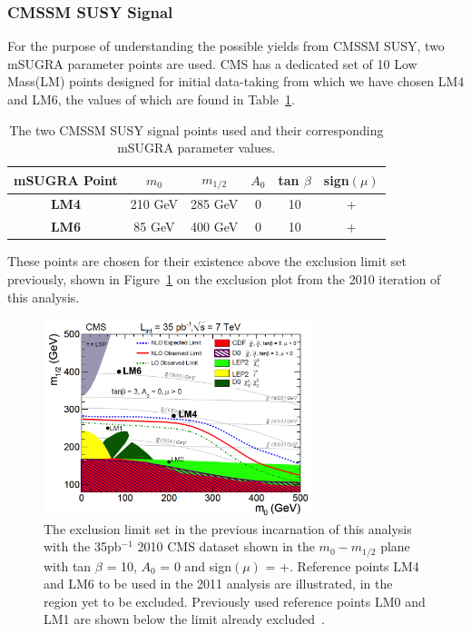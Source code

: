 \subsubsection{CMSSM SUSY Signal}
For the purpose of understanding the possible yields from CMSSM SUSY, two mSUGRA parameter points are used. CMS has a dedicated set of 10 Low Mass(LM) points designed for initial data-taking from which we have chosen LM4 and LM6, the values of which are found in Table~\ref{tab:LM}. 

\begin{table}[htbp]
\centering
\begin{tabular}{c c c c c c }
\hline
\hline
\textbf{mSUGRA Point} & $m_{0}$ & $m_{1/2}$ & $A_{0}$ & tan $\beta$ & sign$(\mu) $  \\
\hline
\hline
\textbf{LM4} & 210 GeV & 285 GeV  & 0 & 10 & + \\
\textbf{LM6} & 85 GeV & 400 GeV & 0 & 10 & +\\
\hline
\end{tabular}
\caption{\label{tab:LM}The two CMSSM SUSY signal points used and their corresponding mSUGRA parameter values.}
\end{table}

These points are chosen for their existence above the exclusion limit set previously, shown in Figure~\ref{fig:lm35limit} on the exclusion plot from the 2010 iteration of this analysis\cite{35paper}.

\begin{figure}[htbp]
\centering
\includegraphics[width=0.70\textwidth]{Figures/Analysis/LM46on35limit}
\caption{\label{fig:lm35limit}The exclusion limit set in the previous incarnation of this analysis with the 35pb$^{-1}$ 2010 CMS dataset shown in the $m_{0}-m_{1/2}$ plane with tan $\beta$ = 10, $A_{0}$ = 0 and sign$(\mu)$ = +. Reference points LM4 and LM6 to be used in the 2011 analysis are illustrated, in the region yet to be excluded. Previously used reference points LM0 and LM1 are shown below the limit already excluded~\cite{35paper}.}
\end{figure}

